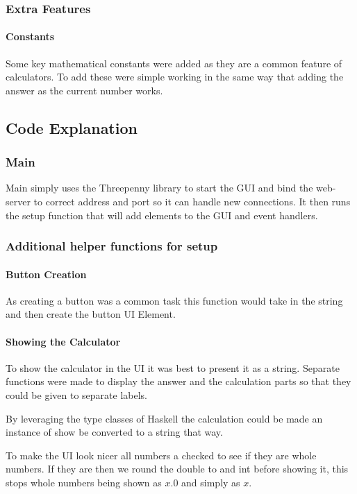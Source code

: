 \documentclass[a4paper]{article}
\begin{document}
\subsubsection{Extra Features}
\paragraph{Constants}
Some key mathematical constants were added as they are a common feature of calculators.
To add these were simple working in the same way that adding the answer as the current number works.


\subsection{Code Explanation}
\subsubsection{Main}
Main simply uses the Threepenny library to start the GUI and bind the web-server to correct address and port so it can handle new connections.
It then runs the setup function that will add elements to the GUI and event handlers.

\subsubsection{Additional helper functions for setup}
\paragraph{Button Creation}
As creating a button was a common task this function would take in the string and then create the button UI Element.


\paragraph{Showing the Calculator}
To show the calculator in the UI it was best to present it as a string.
Separate functions were made to display the answer and the calculation parts so that they could be given to separate labels.
\par
By leveraging the type classes of Haskell the calculation could be made an instance of show be converted to a string that way.
\par
To make the UI look nicer all numbers a checked to see if they are whole numbers.
If they are then we round the double to and int before showing it, this stops whole numbers being shown as \( x.0\) and simply as \( x\).

\end{document}
